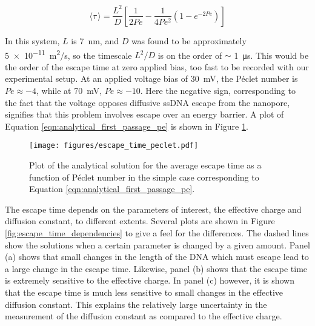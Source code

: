 \begin{equation}
\langle \tau \, \rangle = \frac{L^2}{D} \left[ \frac{1}{2 Pe} - \frac{1}{4 Pe^2} \left( 1 - e^{-2Pe} \right) \right]
\label{eqn:analytical_first_passage_pe}
\end{equation}

In this system, $L$ is \SI{7}{\nm}, and $D$ was found to be approximately \SI{5e-11}{\m^2/\s}, so the timescale $L^2/D$ is on the order of $\sim$ \SI{1}{\us}.  This would be the order of the escape time at zero applied bias, too fast to be recorded with our experimental setup.  At an applied voltage bias of \SI{30}{\mV}, the Péclet number is $Pe \approx -4$, while at \SI{70}{\mV}, $Pe \approx -10$.  Here the negative sign, corresponding to the fact that the voltage opposes diffusive ssDNA escape from the nanopore, signifies that this problem involves escape over an energy barrier.  A plot of Equation \ref{eqn:analytical_first_passage_pe} is shown in Figure \ref{fig:escape_time_peclet}.

\begin{figure}[h]
\begin{centering}
\texttt{[image: figures/escape\_time\_peclet.pdf]}
\caption[Escape time depends on the Péclet number]{Plot of the analytical solution for the average escape time as a function of Péclet number in the simple case corresponding to Equation \ref{eqn:analytical_first_passage_pe}.}
\label{fig:escape_time_peclet}
\end{centering}
\end{figure}

The escape time depends on the parameters of interest, the effective charge and diffusion constant, to different extents.  Several plots are shown in Figure \ref{fig:escape_time_dependencies} to give a feel for the differences.  The dashed lines show the solutions when a certain parameter is changed by a given amount.  Panel (a) shows that small changes in the length of the DNA which must escape lead to a large change in the escape time.  Likewise, panel (b) shows that the escape time is extremely sensitive to the effective charge.  In panel (c) however, it is shown that the escape time is much less sensitive to small changes in the effective diffusion constant.  This explains the relatively large uncertainty in the measurement of the diffusion constant as compared to the effective charge.

